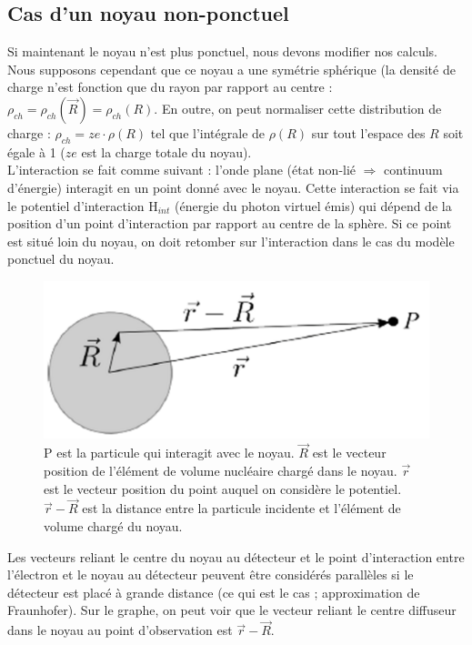 \subsection{Cas d'un noyau non-ponctuel}


Si maintenant le noyau n'est plus ponctuel, nous devons modifier nos calculs. Nous supposons cependant que ce noyau a une symétrie sphérique (la densité de charge n'est fonction que du rayon par rapport au centre : $\rho_{ch} = \rho_{ch}(\vec{R}) = \rho_{ch}(R)$. En outre, on peut normaliser cette distribution de charge : $\rho_{ch} = ze\cdot \rho(R)$ tel que l'intégrale de $\rho(R)$ sur tout l'espace des $R$ soit égale à 1 ($ze$ est la charge totale du noyau).\\

L'interaction se fait comme suivant : l'onde plane (état non-lié $\Rightarrow$ continuum d'énergie) interagit en un point donné avec le noyau. Cette interaction se fait via le potentiel d'interaction H$_{int}$ (énergie du photon virtuel émis) qui dépend de la position d'un point d'interaction par rapport au centre de la sphère. Si ce point est situé loin du noyau, on doit retomber sur l'interaction dans le cas du modèle ponctuel du noyau.\\

\begin{figure}[H]
    \centering
    \includegraphics[scale=0.2]{Images4/schema_interaction.png}
    \caption{P est la particule qui interagit avec le noyau. $\vec{R}$ est le vecteur position de l'élément de volume nucléaire chargé dans le noyau. $\vec{r}$ est le vecteur position du point auquel on considère le potentiel. $\vec{r}-\vec{R}$ est la distance entre la particule incidente et l'élément de volume chargé du noyau.}
    \label{fig:Schéma d'interaction}
\end{figure}

Les vecteurs reliant le centre du noyau au détecteur et le point d'interaction entre l'électron et le noyau au détecteur peuvent être considérés parallèles si le détecteur est placé à grande distance (ce qui est le cas ; approximation de Fraunhofer). Sur le graphe, on peut voir que le vecteur reliant le centre diffuseur dans le noyau au point d'observation est $\vec{r} - \vec{R}$.\\

